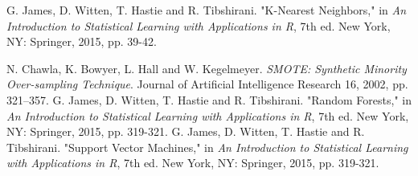 \documentclass[letterpaper, 10 pt, conference]{ieeeconf}  %
\begin{document}
\begin{thebibliography}{99}

 G. James, D. Witten, T. Hastie and R. Tibshirani. "K-Nearest Neighbors," in \textit{An Introduction to Statistical Learning with Applications in R}, 7th ed. New York, NY: Springer, 2015, pp. 39-42.

 N. Chawla, K. Bowyer, L. Hall and W. Kegelmeyer. \textit{SMOTE: Synthetic Minority Over-sampling Technique}. Journal of Artificial Intelligence Research 16, 2002, pp. 321–357. 
 G. James, D. Witten, T. Hastie and R. Tibshirani. "Random Forests," in \textit{An Introduction to Statistical Learning with Applications in R}, 7th ed. New York, NY: Springer, 2015, pp. 319-321.
 G. James, D. Witten, T. Hastie and R. Tibshirani. "Support Vector Machines," in \textit{An Introduction to Statistical Learning with Applications in R}, 7th ed. New York, NY: Springer, 2015, pp. 319-321.









\end{thebibliography}
\end{document}
